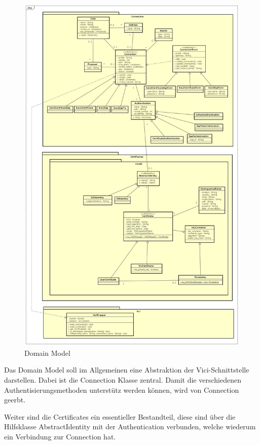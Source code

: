 \begin{figure}[H]
\centering
\includegraphics[width=420pt]{images/domain_model_strongman.png}
\caption[Domain Model]{Domain Model}
\end{figure}

Das Domain Model soll im Allgemeinen eine Abstraktion der Vici-Schnittstelle darstellen.
Dabei ist die Connection Klasse zentral. Damit die verschiedenen Authentisierungsmethoden unterstütz werden können, wird von Connection geerbt.

Weiter sind die Certificates ein essentieller Bestandteil, diese sind über die Hilfsklasse AbstractIdentity mit der Authentication verbunden, welche wiederum ein Verbindung zur Connection hat.

\newpage